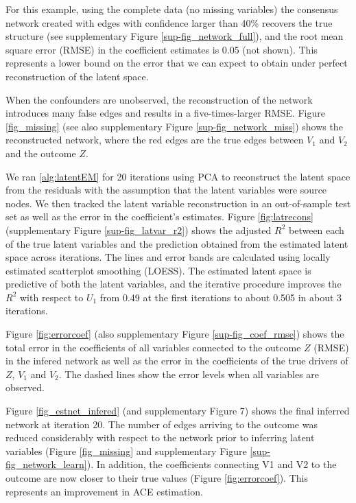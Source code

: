 \documentclass{article}
\begin{document}
For this example, using the complete data (no missing variables) the consensus network created with edges with confidence larger than 40\% recovers the true structure (see supplementary Figure \ref{sup-fig_network_full}), and the root mean square error (RMSE) in the coefficient estimates is 0.05 (not shown). This represents a lower
bound on the error that we can expect to obtain under perfect reconstruction of the latent space.

When the confounders are unobserved, the reconstruction of the network introduces many false edges and results in a five-times-larger RMSE. Figure \ref{fig_missing} (see also supplementary Figure \ref{sup-fig_network_miss}) shows the reconstructed network, where the red edges are the true edges between $V_1$ and $V_2$ and the outcome $Z$.

We ran \ref{alg:latentEM} for 20 iterations using PCA to reconstruct the latent space from the residuals with the assumption that the latent variables were source nodes. We then tracked the latent variable reconstruction in an out-of-sample test set as well as the error in the coefficient's estimates. Figure \ref{fig:latrecons} (supplementary Figure \ref{sup-fig_latvar_r2}) shows the adjusted $R^2$ between each of the true latent variables and the prediction obtained from the estimated latent space across iterations. The lines and error bands are calculated using locally estimated scatterplot smoothing (LOESS). The estimated latent space is predictive of both the latent variables, and the iterative procedure improves the $R^2$ with respect to $U_1$ from 0.49 at the first iterations to about 0.505 in about 3 iterations.

Figure \ref{fig:errorcoef} (also supplementary Figure \ref{sup-fig_coef_rmse}) shows the total error in the coefficients
of all variables connected to the outcome $Z$ (RMSE) in the infered network as
well as the error in the coefficients of the true drivers of $Z$, $V_1$
and $V_2$. The dashed lines show the error levels when all variables are observed.


Figure \ref{fig_estnet_infered}  (and supplementary Figure 7) shows the final inferred network at iteration 20. The number of edges arriving to the outcome was reduced considerably with respect to the network prior to inferring latent variables (Figure \ref{fig_missing} and supplementary Figure \ref{sup-fig_network_learn}). In addition, the coefficients connecting V1 and V2 to the outcome are now closer to their true values (Figure \ref{fig:errorcoef}). This represents an improvement in ACE estimation.
\end{document}
